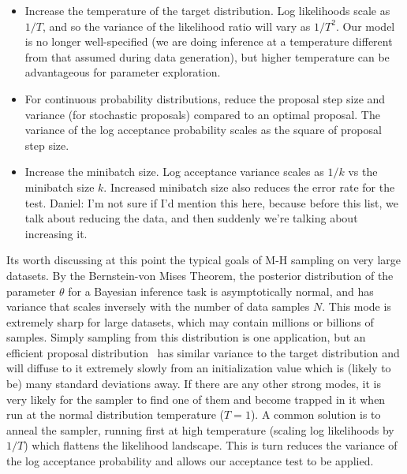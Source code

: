 \documentclass{article}
\begin{document}
\begin{itemize}
  
\item Increase the temperature of the target distribution. Log likelihoods
  scale as $1/T$, and so the variance of the likelihood ratio will
  vary as $1/T^2$. Our model is no longer well-specified (we are doing inference
  at a temperature different from that assumed during data generation), but
  higher temperature can be advantageous for parameter exploration.

\item For continuous probability distributions, reduce the proposal
  step size and variance (for stochastic proposals) compared to an optimal
  proposal. The variance of the log acceptance probability scales as the
  square of proposal step size. 

\item Increase the minibatch size. Log acceptance variance scales as $1/k$ vs the
  minibatch size $k$. Increased minibatch size also reduces the error rate for
  the test. {\color{blue} Daniel: I'm not sure if I'd mention this here, because
  before this list, we talk about reducing the data, and then suddenly we're
  talking about increasing it.}

\end{itemize}

Its worth discussing at this point the typical goals of
M-H sampling on very large datasets.  By the Bernstein-von Mises
Theorem, the posterior distribution of the parameter $\theta$ for a
Bayesian inference task is asymptotically normal, and has variance
that scales inversely with the number of data samples $N$. This mode
is extremely sharp for large datasets, which may contain millions or
billions of samples. Simply sampling from this distribution is one
application, but an efficient proposal distribution~\cite{OptimalScaling01} has similar variance to the target
distribution and will diffuse to it extremely slowly from an
initialization value which is (likely to be) many standard deviations
away. If there are any other strong modes, it is very likely for the
sampler to find one of them and become trapped in it when run at the
normal distribution temperature ($T=1$). A common solution is to anneal
the sampler, running first at high temperature (scaling log
likelihoods by $1/T$) which flattens the likelihood landscape.  This is
turn reduces the variance of the log acceptance probability and allows
our acceptance test to be applied.
\end{document}
